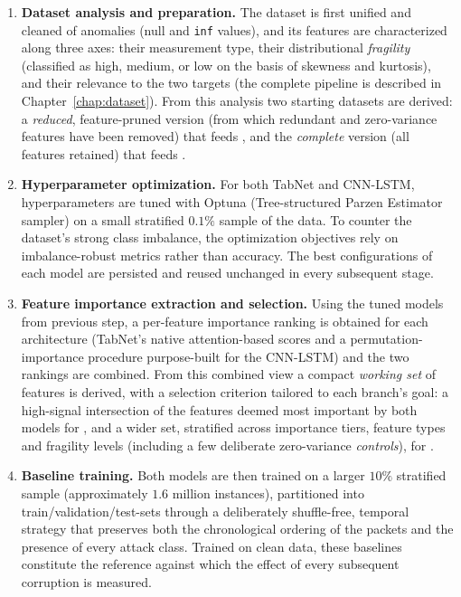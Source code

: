 \documentclass[../main.tex]{subfiles}
\begin{document}
\begin{enumerate}
    \item \textbf{Dataset analysis and preparation.} The dataset is first unified and cleaned of anomalies (null and \texttt{inf} values), and its features are characterized along three axes: their measurement type, their distributional \emph{fragility} (classified as high, medium, or low on the basis of skewness and kurtosis), and their relevance to the two targets (the complete pipeline is described in Chapter~\ref{chap:dataset}). From this analysis two starting datasets are derived: a \emph{reduced}, feature-pruned version (from which redundant and zero-variance features have been removed) that feeds , and the \emph{complete} version (all features retained) that feeds .

    \item \textbf{Hyperparameter optimization.} For both TabNet and CNN-LSTM, hyperparameters are tuned with Optuna (Tree-structured Parzen Estimator sampler) on a small stratified $0.1\%$ sample of the data. To counter the dataset's strong class imbalance, the optimization objectives rely on imbalance-robust metrics rather than accuracy. The best configurations of each model are persisted and reused unchanged in every subsequent stage.

    \item \textbf{Feature importance extraction and selection.} Using the tuned models from previous step, a per-feature importance ranking is obtained for each architecture (TabNet's native attention-based scores and a permutation-importance procedure purpose-built for the CNN-LSTM) and the two rankings are combined. From this combined view a compact \emph{working set} of features is derived, with a selection criterion tailored to each branch's goal: a high-signal intersection of the features deemed most important by both models for , and a wider set, stratified across importance tiers, feature types and fragility levels (including a few deliberate zero-variance \emph{controls}), for .

    \item \textbf{Baseline training.} Both models are then trained on a larger $10\%$ stratified sample (approximately $1.6$ million instances), partitioned into train/validation/test-sets through a deliberately shuffle-free, temporal strategy that preserves both the chronological ordering of the packets and the presence of every attack class. Trained on clean data, these baselines constitute the reference against which the effect of every subsequent corruption is measured.


\end{enumerate}
\end{document}
